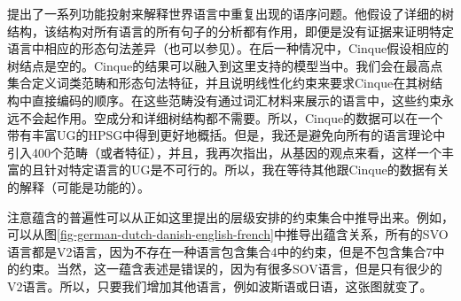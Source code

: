 提出了一系列功能投射来解释世界语言中重复出现的语序问题。他假设了详细的树结构，该结构对所有语言的所有句子的分析都有作用，即便是没有证据来证明特定语言中相应的形态句法差异（也可以参见\citet[]{CR2010a}）。在后一种情况中，Cinque假设相应的树结点是空的。Cinque的结果可以融入到这里支持的模型当中。我们会在最高点集合定义词类范畴和形态句法特征，并且说明线性化约束来要求Cinque在其树结构中直接编码的顺序。在这些范畴没有通过词汇材料来展示的语言中，这些约束永远不会起作用。空成分和详细树结构都不需要。所以，Cinque的数据可以在一个带有丰富UG的HPSG中得到更好地概括。但是，我还是避免向所有的语言理论中引入400个范畴（或者特征），并且，我再次指出，从基因的观点来看，这样一个丰富的且针对特定语言的UG是不可行的。所以，我在等待其他跟Cinque的数据有关的解释（可能是功能的）。

注意蕴含的普遍性可以从正如这里提出的层级安排的约束集合中推导出来。例如，可以从图\ref{fig-german-dutch-danish-english-french}中推导出蕴含关系，所有的SVO语言都是V2语言，因为不存在一种语言包含集合4中的约束，但是不包含集合7中的约束。当然，这一蕴含表述是错误的，因为有很多SOV语言，但是只有很少的V2语言。所以，只要我们增加其他语言，例如波斯语或日语，这张图就变了。

